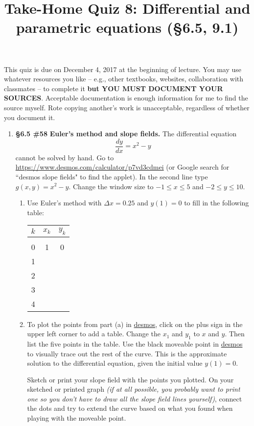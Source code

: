 \documentclass[%
]{article}
\title{\vspace{-3.5pc} 
	\flushleft \bf \Large Take-Home Quiz 8: Differential and parametric equations %
	 (\S6.5, 9.1)}
\date{}
\begin{document}
\maketitle

\vspace{-3pc}
 This quiz is due on December 4, 2017 at the beginning of lecture.  You may use whatever resources you like -- e.g., other textbooks, websites, collaboration with classmates -- to complete it \textbf{but YOU MUST DOCUMENT YOUR SOURCES}.  Acceptable documentation is enough information for me to find the source myself.  Rote copying another's work is unacceptable, regardless of whether you document it.  

\noindent\hrulefill

\begin{enumerate}

\item {\bf \S6.5 \#58}  \textbf{Euler's method and slope fields.}  The differential equation 
\[
\frac{dy}{dx}=x^2-y
\]
cannot be solved by hand.  Go to \url{https://www.desmos.com/calculator/p7vd3cdmei} (or Google search for ``desmos slope fields" to find the applet).  In the second line type $g(x,y)=x^2-y$.  Change the window size to $-1\leq x\leq 5$ and $-2\leq y\leq 10$.
	\begin{enumerate}
	\item Use Euler's method with $\Delta x=0.25$ and $y(1)=0$ to fill in the following table:
	\begin{center}
	\begin{tabular}{c | c | c}
	$k$ & $x_k$ & $y_k$ \\[0.25pc]
	\hline
	 & & \\[-0.75pc]
	0 & 1 & 0 \\
	1 & & \\
	2 & & \\
	3 & & \\
	4 & & 		
	\end{tabular}	
	\end{center}	
	\item To plot the points from part (a) in \url{desmos}, click on the plus sign in the upper left corner to add a table.  Change the $x_1$ and $y_1$ to $x$ and $y$.  Then list the five points in the table.  Use the black moveable point in \url{desmos} to visually trace out the rest of the curve.  This is the approximate solution to the differential equation, given the initial value $y(1)=0$.  
	
	\vspace{0.5pc}
	Sketch or print your slope field with the points you plotted.  On your sketched or printed graph \textit{(if at all possible, you probably want to print one so you don't have to draw all the slope field lines yourself)}, connect the dots and try to extend the curve based on what you found when playing with the moveable point.
	

\end{enumerate}
\end{enumerate}
\end{document}
